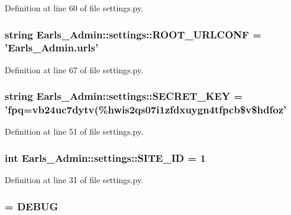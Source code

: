 Definition at line 60 of file settings.py.\hypertarget{namespaceEarls__Admin_1_1settings_2916accd1d1268d43e9e42a5c4cae02e}{
\subsubsection[ROOT\_\-URLCONF]{\setlength{\rightskip}{0pt plus 5cm}string {\bf Earls\_\-Admin::settings::ROOT\_\-URLCONF} = 'Earls\_\-Admin.urls'}}
\label{namespaceEarls__Admin_1_1settings_2916accd1d1268d43e9e42a5c4cae02e}




Definition at line 67 of file settings.py.\hypertarget{namespaceEarls__Admin_1_1settings_f09be1430acd1d6821f2f79cf8db34f2}{
\subsubsection[SECRET\_\-KEY]{\setlength{\rightskip}{0pt plus 5cm}string {\bf Earls\_\-Admin::settings::SECRET\_\-KEY} = 'fpq=vb24uc7dytv(\%hwis2qs07i1zfdxuygn4tfpcb\$v\$hdfoz'}}
\label{namespaceEarls__Admin_1_1settings_f09be1430acd1d6821f2f79cf8db34f2}




Definition at line 51 of file settings.py.\hypertarget{namespaceEarls__Admin_1_1settings_2fc043980861294abcff6dece3e61608}{
\subsubsection[SITE\_\-ID]{\setlength{\rightskip}{0pt plus 5cm}int {\bf Earls\_\-Admin::settings::SITE\_\-ID} = 1}}
\label{namespaceEarls__Admin_1_1settings_2fc043980861294abcff6dece3e61608}




Definition at line 31 of file settings.py.\hypertarget{namespaceEarls__Admin_1_1settings_f9798dc89daf7ca92cc1e10551a785d7}{
\subsubsection[TEMPLATE\_\-DEBUG]{ = {\bf DEBUG}}}
\label{namespaceEarls__Admin_1_1settings_f9798dc89daf7ca92cc1e10551a785d7}




